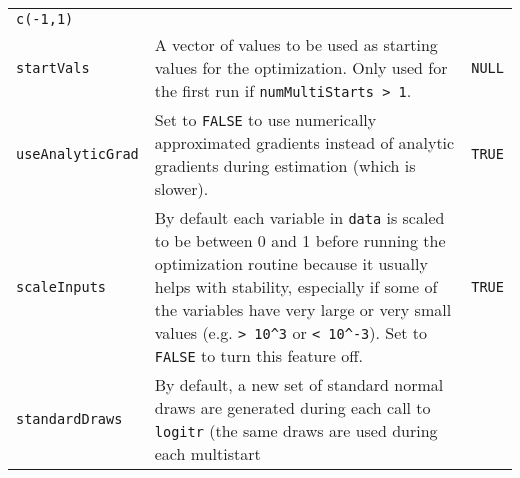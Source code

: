 \documentclass[article]{jss}
\begin{document}
\begin{longtable}[]{@{}lll@{}}
\begin{minipage}[t]{0.12\columnwidth}
\texttt{c(-1,1)}\strut
\end{minipage}\tabularnewline
\begin{minipage}[t]{0.18\columnwidth}\raggedright
\texttt{startVals}\strut
\end{minipage} & \begin{minipage}[t]{0.61\columnwidth}\raggedright
A vector of values to be used as starting values for the optimization.
Only used for the first run if
\texttt{numMultiStarts\ \textgreater{}\ 1}.\strut
\end{minipage} & \begin{minipage}[t]{0.12\columnwidth}\raggedright
\texttt{NULL}\strut
\end{minipage}\tabularnewline
\begin{minipage}[t]{0.18\columnwidth}\raggedright
\texttt{useAnalyticGrad}\strut
\end{minipage} & \begin{minipage}[t]{0.61\columnwidth}\raggedright
Set to \texttt{FALSE} to use numerically approximated gradients instead
of analytic gradients during estimation (which is slower).\strut
\end{minipage} & \begin{minipage}[t]{0.12\columnwidth}\raggedright
\texttt{TRUE}\strut
\end{minipage}\tabularnewline
\begin{minipage}[t]{0.18\columnwidth}\raggedright
\texttt{scaleInputs}\strut
\end{minipage} & \begin{minipage}[t]{0.61\columnwidth}\raggedright
By default each variable in \texttt{data} is scaled to be between 0 and
1 before running the optimization routine because it usually helps with
stability, especially if some of the variables have very large or very
small values (e.g. \texttt{\textgreater{}\ 10\^{}3} or
\texttt{\textless{}\ 10\^{}-3}). Set to \texttt{FALSE} to turn this
feature off.\strut
\end{minipage} & \begin{minipage}[t]{0.12\columnwidth}\raggedright
\texttt{TRUE}\strut
\end{minipage}\tabularnewline
\begin{minipage}[t]{0.18\columnwidth}\raggedright
\texttt{standardDraws}\strut
\end{minipage} & \begin{minipage}[t]{0.61\columnwidth}\raggedright
By default, a new set of standard normal draws are generated during each
call to \texttt{logitr} (the same draws are used during each multistart

\end{minipage}
\end{longtable}
\end{document}
